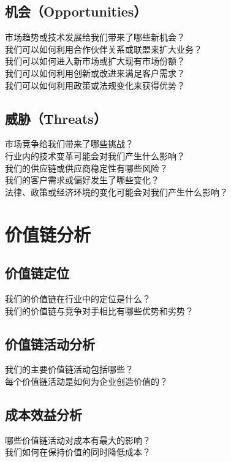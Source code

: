 \documentclass[12pt]{book}
\begin{document}
\subsection{机会（Opportunities）}
市场趋势或技术发展给我们带来了哪些新机会？\\
我们可以如何利用合作伙伴关系或联盟来扩大业务？\\
我们可以如何进入新市场或扩大现有市场份额？\\
我们可以如何利用创新或改进来满足客户需求？\\
我们可以如何利用政策或法规变化来获得优势？\\

\subsection{威胁（Threats）}
市场竞争给我们带来了哪些挑战？\\
行业内的技术变革可能会对我们产生什么影响？\\
我们的供应链或供应商稳定性有哪些风险？\\
我们的客户需求或偏好发生了哪些变化？\\
法律、政策或经济环境的变化可能会对我们产生什么影响？\\


\section{价值链分析}
\subsection{价值链定位}
我们的价值链在行业中的定位是什么？\\
我们的价值链与竞争对手相比有哪些优势和劣势？\\

\subsection{价值链活动分析}
我们的主要价值链活动包括哪些？\\
每个价值链活动是如何为企业创造价值的？\\

\subsection{成本效益分析}
哪些价值链活动对成本有最大的影响？\\
我们如何在保持价值的同时降低成本？\\
\end{document}

